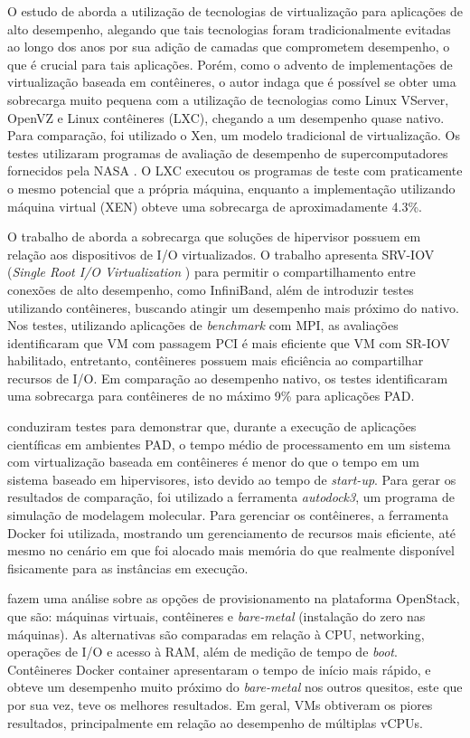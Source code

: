 \documentclass[twoside,english,brazilian]{UNISINOSartigo}
\begin{document}
O estudo de  aborda a utilização de tecnologias de virtualização para aplicações de alto desempenho, alegando que tais tecnologias foram tradicionalmente evitadas ao longo dos anos por sua adição de camadas que comprometem desempenho, o que é crucial para tais aplicações. Porém, como o advento de implementações de virtualização baseada em contêineres, o autor indaga que é possível se obter uma sobrecarga muito pequena com a utilização de tecnologias como Linux VServer, OpenVZ e Linux contêineres (LXC), chegando a um desempenho quase nativo. Para comparação, foi utilizado o Xen, um modelo tradicional de virtualização. Os testes utilizaram programas de avaliação de desempenho de supercomputadores fornecidos pela NASA \cite{NASA2016}. O LXC executou os programas de teste com praticamente o mesmo potencial que a própria máquina, enquanto a implementação utilizando máquina virtual (XEN) obteve uma sobrecarga de aproximadamente 4.3\%.

O trabalho de  aborda a sobrecarga que soluções de hipervisor possuem em relação aos dispositivos de I/O virtualizados. O trabalho apresenta SRV-IOV (\textit{Single Root I/O Virtualization }) para permitir o compartilhamento entre conexões de alto desempenho, como InfiniBand, além de introduzir testes utilizando contêineres, buscando atingir um desempenho mais próximo do nativo. Nos testes, utilizando aplicações de \textit{benchmark} com MPI, as avaliações identificaram que VM com passagem PCI é mais eficiente que VM com SR-IOV habilitado, entretanto, contêineres possuem mais eficiência ao compartilhar recursos de I/O. Em comparação ao desempenho nativo, os testes identificaram uma sobrecarga para contêineres de no máximo 9\% para aplicações PAD.

 conduziram testes para demonstrar que, durante a execução de aplicações científicas em ambientes PAD, o tempo médio de processamento em um sistema com virtualização baseada em contêineres é menor do que o tempo em um sistema baseado em hipervisores, isto devido ao tempo de \textit{start-up}. Para gerar os resultados de comparação, foi utilizado a ferramenta \textit{autodock3}, um programa de simulação de modelagem molecular. Para gerenciar os contêineres, a ferramenta Docker foi utilizada, mostrando um gerenciamento de recursos mais eficiente, até mesmo no cenário em que foi alocado mais memória do que realmente disponível fisicamente para as instâncias em execução. 

 fazem uma análise sobre as opções de provisionamento na plataforma OpenStack, que são: máquinas virtuais, contêineres e \textit{bare-metal} (instalação do zero nas máquinas). As alternativas são comparadas em relação à CPU, networking, operações de I/O e acesso à RAM, além de medição de tempo de \textit{boot}. Contêineres Docker container apresentaram o tempo de início mais rápido, e obteve um desempenho muito próximo do \textit{bare-metal} nos outros quesitos, este que por sua vez, teve os melhores resultados. Em geral, VMs obtiveram os piores resultados, principalmente em relação ao desempenho de múltiplas vCPUs.
\end{document}
